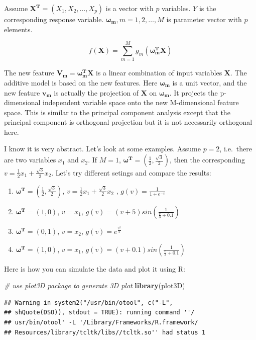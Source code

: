 \documentclass[12pt,]{krantz}
\makeatletter
\newenvironment{Shaded}{\begin{snugshade}}{\end{snugshade}}
\newcommand{\CommentTok}[1]{\textcolor[rgb]{0.37,0.37,0.37}{\textit{#1}}}
\newcommand{\KeywordTok}[1]{\textcolor[rgb]{0.27,0.27,0.27}{\textbf{#1}}}
\newcommand{\NormalTok}[1]{#1}
\newenvironment{kframe}{%
\medskip{}
\setlength{\fboxsep}{.8em}
 \def\at@end@of@kframe{}%
 \ifinner\ifhmode%
  \def\at@end@of@kframe{\end{minipage}}%
  \begin{minipage}{\columnwidth}%
 \fi\fi%
 \def\FrameCommand##1{\hskip\@totalleftmargin \hskip-\fboxsep
 \colorbox{shadecolor}{##1}\hskip-\fboxsep
     \hskip-\linewidth \hskip-\@totalleftmargin \hskip\columnwidth}%
 \MakeFramed {\advance\hsize-\width
   \@totalleftmargin\z@ \linewidth\hsize
   \@setminipage}}%
 {\par\unskip\endMakeFramed%
 \at@end@of@kframe}
\renewenvironment{Shaded}{\begin{kframe}}{\end{kframe}}
\makeatother
\begin{document}
Assume \(\mathbf{X^{T}}=(X_1,X_2,\dots,X_p)\) is a vector with \(p\) variables. \(Y\) is the corresponding response variable. \(\mathbf{\omega_{m}},m=1,2,\dots,M\) is parameter vector with \(p\) elements.

\[f(\mathbf{X})=\sum_{m=1}^{M}g_{m}(\mathbf{\omega_{m}^{T}X})\]

The new feature \(\mathbf{V_{m}}=\mathbf{\omega_{m}^{T}X}\) is a linear combination of input variables \(\mathbf{X}\). The additive model is based on the new features. Here \(\mathbf{\omega_{m}}\) is a unit vector, and the new feature \(\mathbf{v_m}\) is actually the projection of \(\mathbf{X}\) on \(\mathbf{\omega_{m}}\). It projects the p-dimensional independent variable space onto the new M-dimensional feature space. This is similar to the principal component analysis except that the principal component is orthogonal projection but it is not necessarily orthogonal here.

I know it is very abstract. Let's look at some examples. Assume \(p=2\), i.e.~there are two variables \(x_1\) and \(x_2\). If \(M=1\), \(\mathbf{\omega^{T}}=(\frac{1}{2},\frac{\sqrt{3}}{2})\), then the corresponding \(v=\frac{1}{2}x_{1}+\frac{\sqrt{3}}{2}x_{2}\). Let's try different setings and compare the results:

\begin{enumerate}
\def\labelenumi{\arabic{enumi}.}
\item
  \(\mathbf{\omega^{T}}=(\frac{1}{2},\frac{\sqrt{3}}{2})\), \(v=\frac{1}{2}x_{1}+\frac{\sqrt{3}}{2}x_{2}\) , \(g(v)=\frac{1}{1+e^{-v}}\)
\item
  \(\mathbf{\omega^{T}}=(1,0)\), \(v = x_1\), \(g(v)=(v+5)sin(\frac{1}{\frac{v}{3}+0.1})\)
\item
  \(\mathbf{\omega^{T}}=(0,1)\), \(v = x_2\), \(g(v)=e^{\frac{v^2}{5}}\)
\item
  \(\mathbf{\omega^{T}}=(1,0)\), \(v = x_1\), \(g(v)=(v+0.1)sin(\frac{1}{\frac{v}{3}+0.1})\)
\end{enumerate}

Here is how you can simulate the data and plot it using R:

\begin{Shaded}
\begin{Highlighting}[]
\CommentTok{# use plot3D package to generate 3D plot}
\KeywordTok{library}\NormalTok{(plot3D)}
\end{Highlighting}
\end{Shaded}

\begin{verbatim}
## Warning in system2("/usr/bin/otool", c("-L",
## shQuote(DSO)), stdout = TRUE): running command ''/
## usr/bin/otool' -L '/Library/Frameworks/R.framework/
## Resources/library/tcltk/libs//tcltk.so'' had status 1
\end{verbatim}
\end{document}

